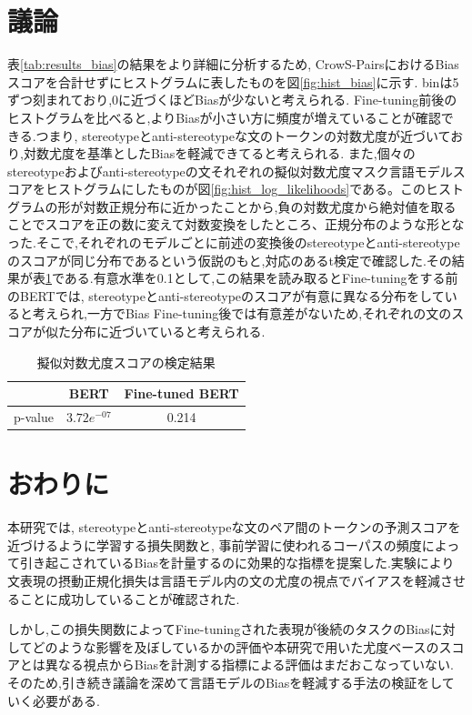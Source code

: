 \documentclass[
  platex, dvipdfmx %
]{nlp2021}
\begin{document}
\section{議論}
表\ref{tab:results_bias}の結果をより詳細に分析するため, CrowS-PairsにおけるBiasスコアを合計せずにヒストグラムに表したものを図\ref{fig:hist_bias}に示す. binは5ずつ刻まれており,0に近づくほどBiasが少ないと考えられる. Fine-tuning前後のヒストグラムを比べると,よりBiasが小さい方に頻度が増えていることが確認できる.つまり, stereotypeとanti-stereotypeな文のトークンの対数尤度が近づいており,対数尤度を基準としたBiasを軽減できてると考えられる.
また,個々のstereotypeおよびanti-stereotypeの文それぞれの擬似対数尤度マスク言語モデルスコアをヒストグラムにしたものが図\ref{fig:hist_log_likelihoods}である。このヒストグラムの形が対数正規分布に近かったことから,負の対数尤度から絶対値を取ることでスコアを正の数に変えて対数変換をしたところ、正規分布のような形となった.そこで,それぞれのモデルごとに前述の変換後のstereotypeとanti-stereotypeのスコアが同じ分布であるという仮説のもと,対応のあるt検定で確認した.その結果が表\ref{tab:t_bias_scores}である.有意水準を0.1として,この結果を読み取るとFine-tuningをする前のBERTでは, stereotypeとanti-stereotypeのスコアが有意に異なる分布をしていると考えられ,一方でBias Fine-tuning後では有意差がないため,それぞれの文のスコアが似た分布に近づいていると考えられる.

\begin{table}[h]
\centering
\begin{tabular}{lcc}
\hline
 &  BERT & Fine-tuned BERT \\
\hline
p-value & $3.72e^{-07}$ &  0.214 \\
\hline
\end{tabular}
\caption{擬似対数尤度スコアの検定結果}
\label{tab:t_bias_scores}
\end{table}

\section{おわりに}
本研究では, stereotypeとanti-stereotypeな文のペア間のトークンの予測スコアを近づけるように学習する損失関数と, 事前学習に使われるコーパスの頻度によって引き起こされているBiasを計量するのに効果的な指標を提案した.実験により文表現の摂動正規化損失は言語モデル内の文の尤度の視点でバイアスを軽減させることに成功していることが確認された.

しかし,この損失関数によってFine-tuningされた表現が後続のタスクのBiasに対してどのような影響を及ぼしているかの評価や本研究で用いた尤度ベースのスコアとは異なる視点からBiasを計測する指標による評価はまだおこなっていない.そのため,引き続き議論を深めて言語モデルのBiasを軽減する手法の検証をしていく必要がある.

\clearpage




\end{document}
